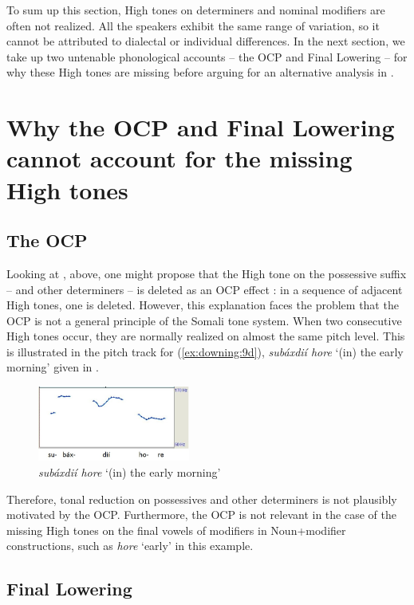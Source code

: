\documentclass[output=paper]{langscibook}
\begin{document}
To sum up this section, High tones on determiners and nominal modifiers are often not realized. All the speakers exhibit the same range of variation, so it cannot be attributed to dialectal or individual differences. In the next section, we take up two untenable phonological accounts – the OCP and Final Lowering – for why these High tones are missing before arguing for an alternative analysis in .


\section{Why the OCP and Final Lowering cannot account for the missing High tones}
\label{sec:downing:3}

\subsection{The OCP}


Looking at , above, one might propose that the High tone on the possessive suffix – and other determiners – is deleted as an OCP effect \citep{leben1973suprasegmental}: in a sequence of adjacent High tones, one is deleted. However, this explanation faces the problem that the OCP is not a general principle of the Somali tone system. When two consecutive High tones occur, they are normally realized on almost the same pitch level. This is illustrated in the pitch track for (\ref{ex:downing:9d}), \textit{subáxdií hore} ‘(in) the early morning’ given in .

  
\begin{figure}
\includegraphics[width=5cm]{figures/downing-img2.jpg}
\caption{\textit{subáxdií hore} ‘(in) the early morning’}                
\label{fig:downing:2}
\end{figure}
 
Therefore, tonal reduction on possessives and other determiners is not plausibly motivated by the OCP. Furthermore, the OCP is not relevant in the case of the missing High tones on the final vowels of modifiers in Noun+modifier constructions, such as \textit{hore} ‘early’ in this example.

\subsection{Final Lowering}
\end{document}
